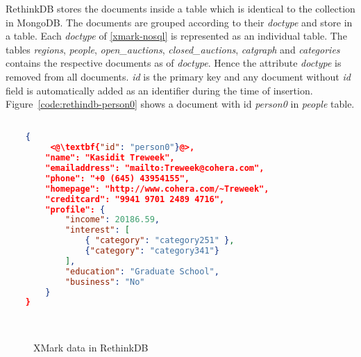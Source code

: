 RethinkDB stores the documents inside a table which is identical to the collection in MongoDB. 
The documents are grouped according to their \textit{doctype} and store in a table.
Each \textit{doctype} of \ref{xmark-nosql} is represented as an individual table. 
The tables \textit{regions}, \textit{people}, \textit{open\_auctions}, \textit{closed\_auctions}, \textit{catgraph} and \textit{categories} contains the respective documents as of \textit{doctype}. Hence the attribute \textit{doctype} is removed from all documents.  \textit{id} is the primary key and any document without \textit{id} field is automatically added as an identifier during the time of insertion. Figure~\ref{code:rethindb-person0} shows a document with id \textit{person0} in \textit{people} table.


\newbox\rethinkdbXmarkDocument
\begin{lrbox}{\rethinkdbXmarkDocument}
\begin{lstlisting}[language=JSON,basicstyle =\scriptsize]

	{
		 <@\textbf{"id": "person0"}@>,
		"name": "Kasidit Treweek",
		"emailaddress": "mailto:Treweek@cohera.com",
		"phone": "+0 (645) 43954155",
		"homepage": "http://www.cohera.com/~Treweek",
		"creditcard": "9941 9701 2489 4716",
		"profile": {
			"income": 20186.59,
			"interest": [
			    { "category": "category251" },
				{"category": "category341"}
			],
			"education": "Graduate School",
			"business": "No"
		}
	}
\end{lstlisting}
\end{lrbox}


\newbox\rethinkdbXmarkChart
\begin{lrbox}{\rethinkdbXmarkChart}
\end{lrbox}

\begin{figure}[hhtp]
\centering
{}
\\
\centering
{}

\caption{XMark data in RethinkDB}
\label{xmark-rethinkdb-figure}
\end{figure}